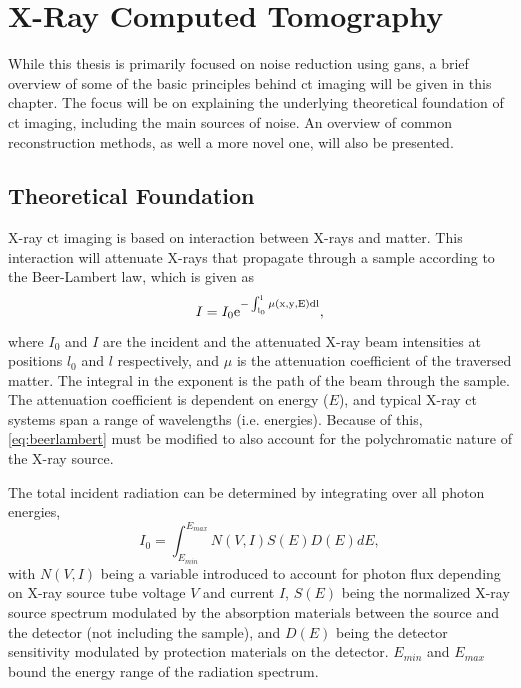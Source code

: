 \chapter{X-Ray Computed Tomography}
\label{sec:ct}
While this thesis is primarily focused on noise reduction using \acrshort{gan}s, a brief overview of some of the basic principles behind \acrfull{ct} imaging will be given in this chapter. The focus will be on explaining the underlying theoretical foundation of \acrshort{ct} imaging, including the main sources of noise. An overview of common reconstruction methods, as well a more novel one, will also be presented.

\section{Theoretical Foundation}
\label{sec:ct:theoreticalfoundation}
X-ray \acrshort{ct} imaging is based on interaction between X-rays and matter. This interaction will attenuate X-rays that propagate through a sample according to the Beer-Lambert law, which is given as \cite{doi:10.1063/1.4950807}
\begin{equation}
    \label{eq:beerlambert}
    I = I_0 \rm{e}^{-\int_{l_0}^{l}\mu\left(x,y,E\right)dl},
\end{equation}
where $I_0$ and $I$ are the incident and the attenuated X-ray beam intensities at positions $l_0$ and $l$ respectively, and $\mu$ is the attenuation coefficient of the traversed matter. The integral in the exponent is the path of the beam through the sample. The attenuation coefficient is dependent on energy ($E$), and typical X-ray \acrshort{ct} systems span a range of wavelengths (i.e. energies). 
Because of this, \cref{eq:beerlambert} must be modified to also account for the polychromatic nature of the X-ray source. 

The total incident radiation can be determined by integrating over all photon energies, 
\begin{equation}
    \label{eq:incidentradiation}
    I_0 = \int_{E_{min}}^{E_{max}}N\left(V,I\right)S\left(E\right)D\left(E\right)dE,
\end{equation}
with $N\left(V,I\right)$ being a variable introduced to account for photon flux depending on X-ray source tube voltage $V$ and current $I$, $S\left(E\right)$ being the normalized X-ray source spectrum modulated by the absorption materials between the source and the detector (not including the sample), and $D\left(E\right)$ being the detector sensitivity modulated by protection materials on the detector. $E_{min}$ and $E_{max}$ bound the energy range of the radiation spectrum. 


